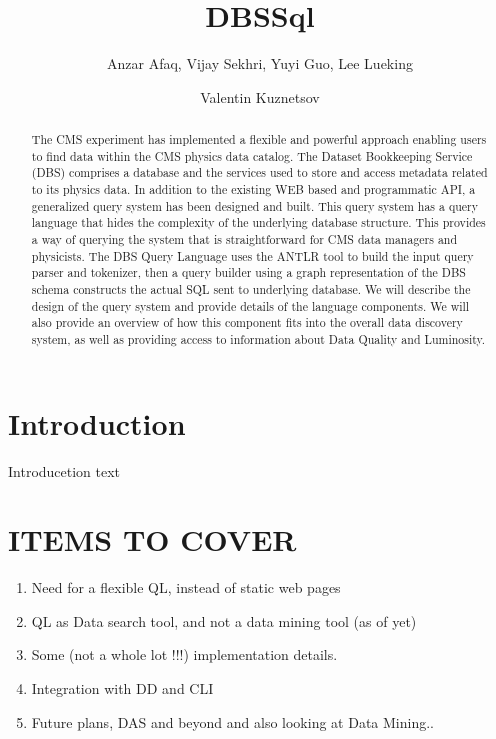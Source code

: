 \documentclass[a4paper]{jpconf}
\begin{document}
\title{DBSSql}

\author{Anzar Afaq, Vijay Sekhri, Yuyi Guo, Lee Lueking}
\address{Fermilab, Batavia, Illinois, USA}

\author{Valentin Kuznetsov}
\address{Cornell University, Ithaca, NY 14853, USA}

\begin{abstract}
The CMS experiment has implemented a flexible and 
powerful approach enabling users to find data within 
the CMS physics data catalog. The Dataset Bookkeeping 
Service (DBS) comprises a database and the services 
used to store and access metadata related to its physics 
data. In addition to the existing WEB based and programmatic 
API, a generalized query system has been designed and built. 
This query system has a query language that hides the 
complexity of the underlying database structure. This provides 
a way of querying the system that is straightforward for 
CMS data managers and physicists. The DBS Query Language 
uses the ANTLR tool to build the input query parser and tokenizer, 
then a query builder using a graph representation of the 
DBS schema constructs the actual SQL sent to underlying database. 
We will describe the design of the query system and provide 
details of the language components. We will also provide an 
overview of how this component fits into the overall data 
discovery system, as well as providing access to information 
about Data Quality and Luminosity.
\end{abstract}

\section{Introduction}
Introducetion text

\section{ITEMS TO COVER}
\begin{enumerate}
\item Need for a flexible QL, instead of static web pages
\item QL as Data search tool, and not a data mining tool (as of yet)
\item Some (not a whole lot !!!) implementation details.
\item Integration with DD and CLI
\item Future plans, DAS and beyond and also looking at Data Mining..
\end{enumerate}
\end{document}
